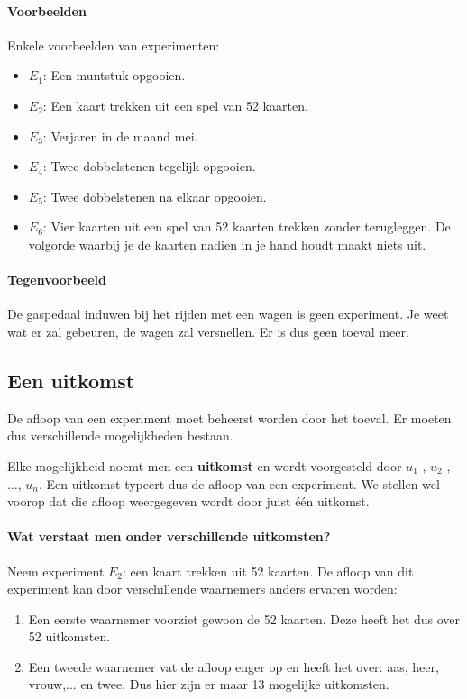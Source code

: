 \documentclass[12pt,twoside]{article}
\begin{document}
\paragraph*{Voorbeelden} Enkele voorbeelden van experimenten:
\begin{itemize}
  \item $E_1$: Een muntstuk opgooien.
  \item $E_2$: Een kaart trekken uit een spel van 52 kaarten.
  \item $E_3$: Verjaren in de maand mei.
  \item $E_4$: Twee dobbelstenen tegelijk opgooien.
  \item $E_5$: Twee dobbelstenen na elkaar opgooien.
  \item $E_6$: Vier kaarten uit een spel van 52 kaarten trekken zonder terugleggen. De volgorde waarbij je de kaarten nadien in je hand houdt maakt niets uit.
\end{itemize}

\paragraph*{Tegenvoorbeeld}
De gaspedaal induwen bij het rijden met een wagen is geen experiment. Je weet wat er zal gebeuren, de wagen zal versnellen. Er is dus geen toeval meer.


\subsection{Een uitkomst}

De afloop van een experiment moet beheerst worden door het toeval. Er moeten dus verschillende mogelijkheden bestaan.

Elke mogelijkheid noemt men een {\bf uitkomst} en wordt voorgesteld door $u_1$ , $u_2$ , $\ldots$, $u_n$. Een uitkomst typeert dus de afloop van een experiment. We stellen wel voorop dat die afloop weergegeven wordt door juist één uitkomst.

\paragraph*{Wat verstaat men onder verschillende uitkomsten?}

Neem experiment $E_2$: een kaart trekken uit 52 kaarten. De afloop van dit experiment
kan door verschillende waarnemers anders ervaren worden:
\begin{enumerate}
  \item Een eerste waarnemer voorziet gewoon de 52 kaarten. Deze heeft het dus over 52 uitkomsten.
  \item Een tweede waarnemer vat de afloop enger op en heeft het over: aas, heer, vrouw,... en twee. Dus hier zijn er maar 13 mogelijke uitkomsten.
\end{enumerate}
\end{document}
